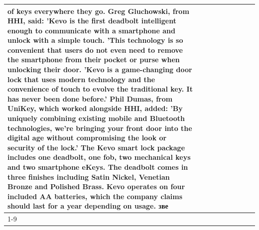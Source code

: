 \begin{table}[H]
\begin{tabular}{lllrlllll}
of keys everywhere they go. Greg Gluchowski, from HHI, said: 'Kevo is the first deadbolt intelligent enough to communicate with a smartphone and unlock with a simple touch. 'This technology is so convenient that users do not even need to remove the smartphone from their pocket or purse when unlocking their door. 'Kevo is a game-changing door lock that uses modern technology and the convenience of touch to evolve the traditional key. It has never been done before.' Phil Dumas, from UniKey, which worked alongside HHI, added: 'By uniquely combining existing mobile and Bluetooth technologies, we’re bringing your front door into the digital age without compromising the look or security of the lock.' The Kevo smart lock package includes one deadbolt, one fob, two mechanical keys and two smartphone eKeys. The deadbolt comes in three finishes including Satin Nickel, Venetian Bronze and Polished Brass. Kevo operates on four included AA batteries, which the company claims should last for a year depending on usage. зве \\
\cline{1-9}

\end{tabular}
\end{table}
